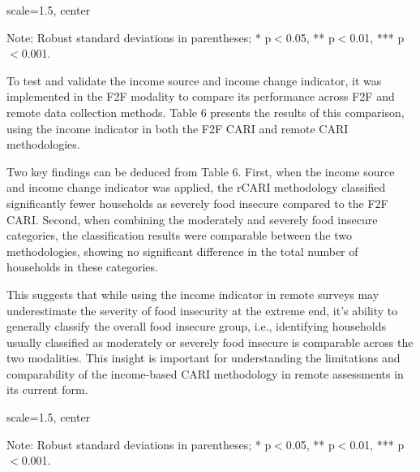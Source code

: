 \documentclass[11pt,harvard]{article}
\begin{document}
	\begin{table}[htbp]
		\centering
		\begin{adjustbox}{scale=1.5, center} %
			\begin{threeparttable}
				\caption{Impact of Survey Modality: CARI-FES vs. rCARI-FES}
				\footnotesize
				 
				\label{tab:CARI_FES_rCARI_Modality_BF}
			\begin{tablenotes}
					\item Note: Robust standard deviations in parentheses; * p$<$0.05, ** p$<$0.01, *** p$<$0.001. 
				\end{tablenotes}
			\end{threeparttable}
		\end{adjustbox}
	\end{table}
	
	To test and validate the income source and income change indicator, it was implemented in the F2F modality to compare its performance across F2F and remote data collection methods. Table 6 presents the results of this comparison, using the income indicator in both the F2F CARI and remote CARI methodologies. 
	
	Two key findings can be deduced from Table 6. First, when the income source and income change indicator was applied, the rCARI methodology classified significantly fewer households as severely food insecure compared to the F2F CARI. Second, when combining the moderately and severely food insecure categories, the classification results were comparable between the two methodologies, showing no significant difference in the total number of households in these categories.
	
	This suggests that while using the income indicator in remote surveys may underestimate the severity of food insecurity at the extreme end, it's ability to generally classify the overall food insecure group, i.e., identifying households usually classified as moderately or severely food insecure is comparable across the two modalities. This insight is important for understanding the limitations and comparability of the income-based CARI methodology in remote assessments in its current form.
	
	\begin{table}[htbp]
		\centering
		\begin{adjustbox}{scale=1.5, center} %
			\begin{threeparttable}
				\caption{Impact of Survey Modality: CARI-Inc vs. rCARI-Inc}
				\footnotesize
				 
				\label{tab:Inc_CARI_rCARI_Modality_BF}
				\begin{tablenotes}
					\item Note: Robust standard deviations in parentheses; * p$<$0.05, ** p$<$0.01, *** p$<$0.001. 
				\end{tablenotes}
			\end{threeparttable}
		\end{adjustbox}
	\end{table}
	
\end{document}
